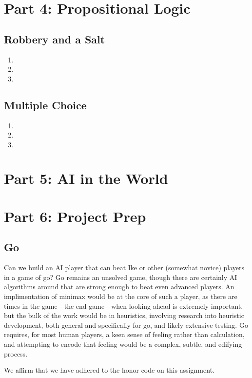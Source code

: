 \documentclass[11pt]{amsart}
\newcommand{\honor}{We affirm that we have adhered to the honor code on this assignment.}
\begin{document}
\section*{Part 4: Propositional Logic}

\subsection*{Robbery and a Salt}

\begin{enumerate}
\item
\item
\item
\end{enumerate}

\subsection*{Multiple Choice}

\begin{enumerate}
\item
\item
\item
\end{enumerate}

\section*{Part 5: AI in the World}

\section*{Part 6: Project Prep}

\subsection*{Go}
Can we build an AI player that can beat Ike or other (somewhat novice) players in a game of go?  Go
remains an unsolved game, though there are certainly AI algorithms around that are strong enough to
beat even advanced players.  An implimentation of minimax would be at the core of such a player, as
there are times in the game\----the end game\----when looking ahead is extremely important, but the
bulk of the work would be in heuristics, involving research into heuristic development, both general
and specifically for go, and likely extensive testing.  Go requires, for most human players, a keen
sense of feeling rather than calculation, and attempting to encode that feeling would be a complex,
subtle, and edifying process.

\honor
\end{document}

